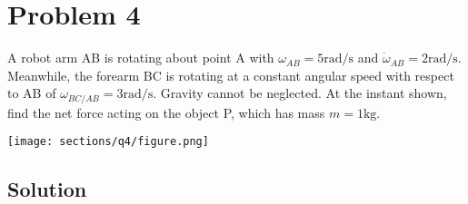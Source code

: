 \section*{Problem 4}

A robot arm AB is rotating about point A with \( \omega_{AB} = 5 \text{rad/s} \) and \( \dot\omega_{AB} = 2 \text{rad/s} \).
Meanwhile, the forearm BC is rotating at a constant angular speed with respect to AB of \( \omega_{BC/AB} = 3 \text{rad/s} \).
Gravity cannot be neglected.
At the instant shown, find the net force acting on the object P, which has mass \( m = 1\text{kg} \).

\begin{figure*}[h]
    \centering
    \texttt{[image: sections/q4/figure.png]}
\end{figure*}

\subsection*{Solution}
